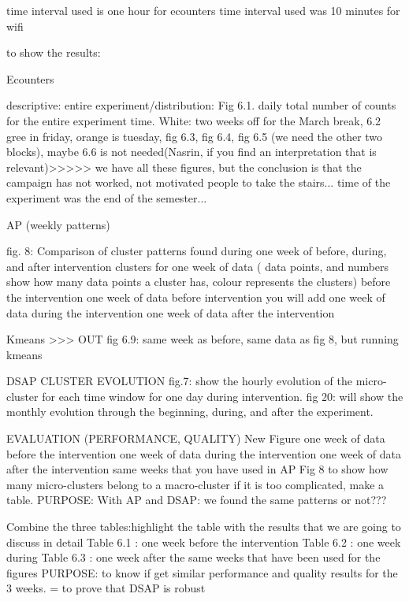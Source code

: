 time interval used is one hour for ecounters
time interval used was 10 minutes for wifi



to show the results:

Ecounters 

descriptive: entire experiment/distribution: Fig 6.1. daily total number of counts for the entire experiment time. White: two weeks off for the March break, 6.2 gree in friday, orange is tuesday, fig 6.3, fig 6.4,  fig 6.5 (we need the other two blocks), maybe 6.6 is not needed(Nasrin, if you find an interpretation that is relevant)>>>>> we have all these figures, but the conclusion is that the campaign has not worked, not motivated people to take the stairs... time of the experiment was the end of the semester...

AP (weekly patterns)

fig. 8: Comparison of cluster patterns found during one week of before, during, and after intervention
clusters for one week of data ( data points, and numbers show how many data points a cluster has, colour represents the clusters) before the intervention 
one week of data before intervention
you will add
one week of data during the intervention
one week of data after the intervention

Kmeans >>>  OUT
fig 6.9: same week as before, same data as fig 8, but running kmeans


DSAP
CLUSTER EVOLUTION
fig.7: show the hourly evolution of the micro-cluster for each time window for one day during intervention.
fig 20: will show the monthly evolution through the beginning, during, and after the experiment. 

EVALUATION (PERFORMANCE, QUALITY)
New Figure
one week of data before the intervention
one week of data during the intervention
one week of data after the intervention
same weeks that you have used in AP Fig 8
to show how many micro-clusters belong to a macro-cluster
if it is too complicated, make a table.
PURPOSE: With AP and DSAP: we found the same patterns or not???

Combine the three tables:highlight the table with the results that we are going to discuss in detail
Table 6.1 : one week before the intervention
Table 6.2  : one week during
Table 6.3 : one week after
the same weeks that have been used for the figures
PURPOSE: to know if get similar performance and quality results for the 3 weeks. = to prove that DSAP is robust





